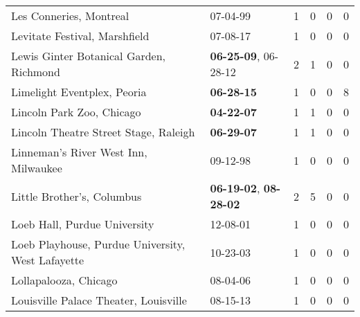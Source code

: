 \begin{longtable}{p{}p{}p{}p{}p{}p{}}
                                                      Les Conneries, Montreal &                                                07-04-99\textsuperscript{} &  1 &  0 &  0 &  0 \\
                                                Levitate Festival, Marshfield &                                                07-08-17\textsuperscript{} &  1 &  0 &  0 &  0 \\
                                      Lewis Ginter Botanical Garden, Richmond &           \textbf{06-25-09\textsuperscript{}}, 06-28-12\textsuperscript{} &  2 &  1 &  0 &  0 \\
                                                  Limelight Eventplex, Peoria &                                       \textbf{06-28-15\textsuperscript{}} &  1 &  0 &  0 &  8 \\
                                                    Lincoln Park Zoo, Chicago &                                       \textbf{04-22-07\textsuperscript{}} &  1 &  1 &  0 &  0 \\
                                        Lincoln Theatre Street Stage, Raleigh &                                       \textbf{06-29-07\textsuperscript{}} &  1 &  1 &  0 &  0 \\
                                         Linneman's River West Inn, Milwaukee &                                                09-12-98\textsuperscript{} &  1 &  0 &  0 &  0 \\
                                                   Little Brother's, Columbus &  \textbf{06-19-02\textsuperscript{}}, \textbf{08-28-02\textsuperscript{}} &  2 &  5 &  0 &  0 \\
                                                 Loeb Hall, Purdue University &                                                12-08-01\textsuperscript{} &  1 &  0 &  0 &  0 \\
                            Loeb Playhouse, Purdue University, West Lafayette &                                                10-23-03\textsuperscript{} &  1 &  0 &  0 &  0 \\
                                                        Lollapalooza, Chicago &                                                08-04-06\textsuperscript{} &  1 &  0 &  0 &  0 \\
                                        Louisville Palace Theater, Louisville &                                                08-15-13\textsuperscript{} &  1 &  0 &  0 &  0 \\

\end{longtable}
